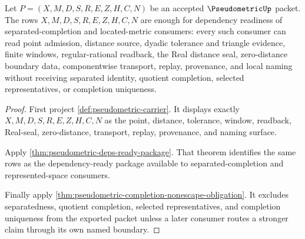 \begin{theorem}
\label{thm:pseudometric-dependency-unblock-surface}
Let $P=(X,M,D,S,R,E,Z,H,C,N)$ be an accepted $\PseudometricUp$ packet. The rows $X,M,D,S,R,E,Z,H,C,N$ are enough for dependency readiness of separated-completion and located-metric consumers: every such consumer can read point admission, distance source, dyadic tolerance and triangle evidence, finite windows, regular-rational readback, the Real distance seal, zero-distance boundary data, componentwise transport, replay, provenance, and local naming without receiving separated identity, quotient completion, selected representatives, or completion uniqueness.
\end{theorem}
\begin{proof}
First project \autoref{def:pseudometric-carrier}. It displays exactly $X,M,D,S,R,E,Z,H,C,N$ as the point, distance, tolerance, window, readback, Real-seal, zero-distance, transport, replay, provenance, and naming surface.

Apply \autoref{thm:pseudometric-deps-ready-package}. That theorem identifies the same rows as the dependency-ready package available to separated-completion and represented-space consumers.

Finally apply \autoref{thm:pseudometric-completion-nonescape-obligation}. It excludes separatedness, quotient completion, selected representatives, and completion uniqueness from the exported packet unless a later consumer routes a stronger claim through its own named boundary.
\end{proof}

